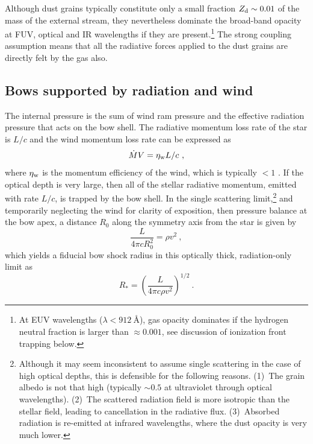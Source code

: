 Although dust grains typically constitute only a small fraction
\(Z_{\text{d}} \sim 0.01\) of the mass of the external stream, they
nevertheless dominate the broad-band opacity at FUV, optical and IR
wavelengths if they are present.\footnote{%
  At EUV wavelengths (\(\lambda < \SI{912}{\angstrom}\)), gas opacity
  dominates if the hydrogen neutral fraction is larger than
  \(\approx 0.001\), see discussion of ionization front trapping
  below.} %
The strong coupling assumption means that all the radiative forces
applied to the dust grains are directly felt by the gas also.

\subsection{Bows supported by radiation and wind}
\label{sec:three-bow-regimes}

The internal pressure is the sum of wind ram pressure and the
effective radiation pressure that acts on the bow shell.  The
radiative momentum loss rate of the star is \(L/c\) and the wind
momentum loss rate can be expressed as
\begin{equation}
  \label{eq:wind-efficiency}
  \dot{M} V = \eta_{\text{w}} L / c \ , 
\end{equation}
where \(\eta_{\text{w}}\) is the momentum efficiency of the wind, which is typically
\(< 1\) \citep{Lamers:1999b}. If the optical depth is very large, then
all of the stellar radiative momentum, emitted with rate \(L/c\), is
trapped by the bow shell.  In the single scattering limit,\footnote{%
  Although it may seem inconsistent to assume single scattering in the
  case of high optical depths, this is defensible for the following
  reasons. (1)~The grain albedo is not that high (typically
  \(\sim 0.5\) at ultraviolet through optical wavelengths). (2)~The
  scattered radiation field is more isotropic than the stellar field,
  leading to cancellation in the radiative flux. (3)~Absorbed
  radiation is re-emitted at infrared wavelengths, where the dust
  opacity is very much lower.} %
and temporarily neglecting the wind for clarity of exposition, then
pressure balance at the bow apex, a distance \(R_0\) along the
symmetry axis from the star is given by
\begin{equation}
  \label{eq:rad-press-balance-thick}
  \frac{L}{4 \pi c R_0^2} = \rho v^2 \ ,
\end{equation}
which yields a fiducial bow shock radius in this optically thick,
radiation-only limit as
\begin{equation}
  \label{eq:Rstar}
  R_* = \left(\frac{L}{4\pi c \rho v^2}\right)^{1/2} \ .
\end{equation}

